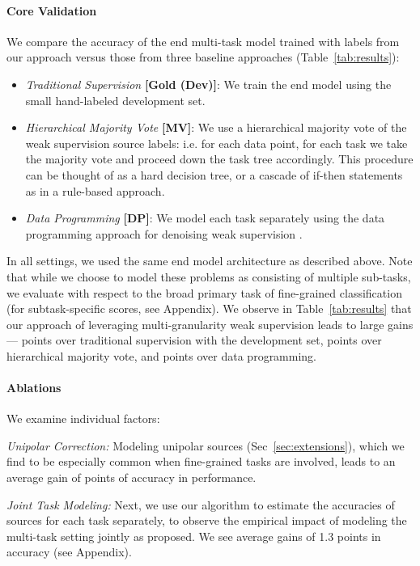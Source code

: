 \documentclass[letterpaper]{article}
\begin{document}
\paragraph*{Core Validation}
We compare the accuracy of the end multi-task model trained with labels from our approach versus those from three baseline approaches (Table~\ref{tab:results}):
\begin{itemize}
  \item \textit{Traditional Supervision} \textbf{[Gold (Dev)]}:
  We train the end model using the small hand-labeled development set.
  
  \item \textit{Hierarchical Majority Vote} \textbf{[MV]}:
  We use a hierarchical majority vote of the weak supervision source labels: i.e. for each data point, for each task we take the majority vote and proceed down the task tree accordingly.
  This procedure can be thought of as a hard decision tree, or a cascade of if-then statements as in a rule-based approach.

  \item \textit{Data Programming} \textbf{[DP]}:
  We model each task separately using the data programming approach for denoising weak supervision \cite{ratner2018snorkel}.
\end{itemize}
In all settings, we used the same end model architecture as described above.
Note that while we choose to model these problems as consisting of multiple sub-tasks, we evaluate with respect to the broad primary task of fine-grained classification (for subtask-specific scores, see Appendix).
We observe in Table~\ref{tab:results} that our approach of leveraging multi-granularity weak supervision leads to large gains--- points over traditional supervision with the development set,  points over hierarchical majority vote, and  points over data programming.

\paragraph*{Ablations}
We examine individual factors:

\textit{Unipolar Correction:}
Modeling unipolar sources (Sec~\ref{sec:extensions}), which we find to be especially common when fine-grained tasks are involved, leads to an average gain of  points of accuracy in \systemx performance.

\textit{Joint Task Modeling:}
Next, we use our algorithm to estimate the accuracies of sources for each task separately, to observe the empirical impact of modeling the multi-task setting jointly as proposed.
We see average gains of 1.3 points in accuracy (see Appendix).
\end{document}
